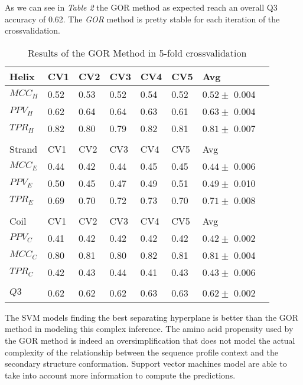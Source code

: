 \documentclass[a4paper,twocolumn]{article}
\begin{document}
As we can see in \emph{Table 2}  the GOR method as expected reach an overall Q3 accuracy of 0.62. The
\emph{GOR} method is pretty stable for each iteration of the crossvalidation.

\begin{table}[htbp]
\caption{Results of the GOR Method in 5-fold crossvalidation}
\centering
\begin{tabular}{p{0.8cm}p{0.5cm}p{0.5cm}p{0.5cm}p{0.5cm}p{0.5cm}ll}
Helix & CV1 & CV2 & CV3 & CV4 & CV5 & Avg\\
\hline
\(MCC_H\) & 0.52 & 0.53 & 0.52 & 0.54 & 0.52 & \(0.52 \pm\) 0.004\\
\(PPV_H\) & 0.62 & 0.64 & 0.64 & 0.63 & 0.61 & \(0.63 \pm\) 0.004\\
\(TPR_H\) & 0.82 & 0.80 & 0.79 & 0.82 & 0.81 & \(0.81 \pm\) 0.007\\
 &  &  &  &  &  & \\
Strand & CV1 & CV2 & CV3 & CV4 & CV5 & Avg\\
\hline
\(MCC_E\) & 0.44 & 0.42 & 0.44 & 0.45 & 0.45 & \(0.44 \pm\) 0.006\\
\(PPV_E\) & 0.50 & 0.45 & 0.47 & 0.49 & 0.51 & \(0.49 \pm\) 0.010\\
\(TPR_E\) & 0.69 & 0.70 & 0.72 & 0.73 & 0.70 & \(0.71 \pm\) 0.008\\
 &  &  &  &  &  & \\
Coil & CV1 & CV2 & CV3 & CV4 & CV5 & Avg\\
\hline
\(PPV_C\) & 0.41 & 0.42 & 0.42 & 0.42 & 0.42 & \(0.42 \pm\) 0.002\\
\(MCC_C\) & 0.80 & 0.81 & 0.80 & 0.82 & 0.81 & \(0.81 \pm\) 0.004\\
\(TPR_C\) & 0.42 & 0.43 & 0.44 & 0.41 & 0.43 & \(0.43 \pm\) 0.006\\
 &  &  &  &  &  & \\
\hline
\(Q3\) & 0.62 & 0.62 & 0.62 & 0.63 & 0.63 & \(0.62 \pm\) 0.002\\
\end{tabular}
\end{table}

 The SVM models finding the best separating hyperplane is better than the GOR
method in modeling this complex inference. The amino acid propensity used by the
GOR method is indeed an oversimplification that does not model the actual
complexity of the relationship between the sequence profile context and the
secondary structure conformation. Support vector machines model are able to take
into account more information to compute the predictions.
\end{document}
